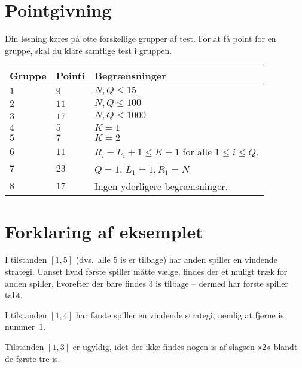 \section*{Pointgivning}
Din løsning køres på otte forskellige grupper af test.
For at få point for en gruppe, skal du klare samtlige test i gruppen.

\noindent
\begin{tabular}{| l | l | p{12cm} |}
\hline
Gruppe & Pointi    & Begrænsninger \\ \hline
$1$     & $9$          &  $N,Q \le 15$ \\ \hline
$2$     & $11$         &  $N,Q \le 100$  \\ \hline
$3$     & $17$         &  $N,Q \le 1000$  \\ \hline
$4$     & $5$          &  $K=1$  \\ \hline
$5$     & $7$          &  $K=2$  \\ \hline
$6$     & $11$         &  $R_i - L_i + 1 \le K+1$ for alle $1 \le i \le Q$. \\ \hline
$7$     & $23$         &  $Q=1$, $L_1=1, R_1=N$ \\ \hline
$8$     & $17$         &  Ingen yderligere begrænsninger. \\ \hline
\end{tabular}

\section*{Forklaring af eksemplet}
I tilstanden $[1,5]$ (dvs.\ alle $5$ is er tilbage) har anden spiller en vindende strategi.
Uanset hvad første spiller måtte vælge, findes der et muligt træk for anden spiller, hvorefter der bare findes $3$ is tilbage -- dermed har første spiller tabt.

I tilstanden $[1,4]$ har første spiller en vindende strategi, nemlig at fjerne is nummer~1.

Tilstanden $[1,3]$ er ugyldig, idet der ikke findes nogen is af slagsen »$2$« blandt de første tre is.
